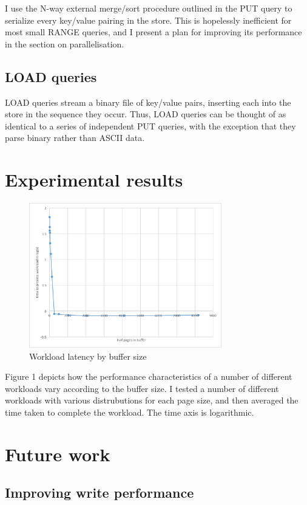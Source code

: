 \documentclass[format=acmtog, review=false]{acmart}
\begin{document}
I use the N-way external merge/sort procedure outlined in the PUT query to serialize every key/value pairing in the store. This is hopelessly inefficient for most small RANGE queries, and I present a plan for improving its performance in the section on parallelisation.

\subsection{LOAD queries}

LOAD queries stream a binary file of key/value pairs, inserting each into the store in the sequence they occur. Thus, LOAD queries can be thought of as identical to a series of independent PUT queries, with the exception that they parse binary rather than ASCII data.

\section{Experimental results}

\begin{figure}
\includegraphics[width=3.3in]{chart}
\caption{Workload latency by buffer size}
\end{figure}

Figure 1 depicts how the performance characteristics of a number of different workloads vary according to the buffer size. I tested a number of different workloads with various distrubutions for each page size, and then averaged the time taken to complete the workload. The time axis is logarithmic.

\section{Future work}

\subsection{Improving write performance}
\end{document}
